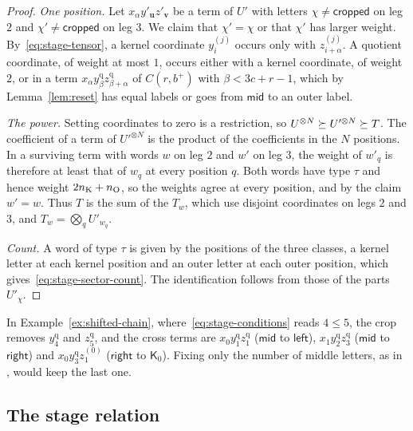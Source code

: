 \begin{proof}
\emph{One position.} Let \(x_\alpha y'_{\mathbf u}z'_{\mathbf v}\) be a
term of \(U'\) with letters \(\chi\ne\mathsf{cropped}\) on leg \(2\) and
\(\chi'\ne\mathsf{cropped}\) on leg \(3\). We claim that \(\chi'=\chi\) or
that \(\chi'\) has larger weight. By~\eqref{eq:stage-tensor}, a kernel
coordinate \(y^{(j)}_i\) occurs only with \(z^{(j)}_{i+\alpha}\). A
quotient coordinate, of weight at most \(1\), occurs either with a kernel
coordinate, of weight \(2\), or in a term
\(x_\alpha y^{\mathrm q}_\beta z^{\mathrm q}_{\beta+\alpha}\) of
\(C(r,b^+)\) with \(\beta<3c+r-1\), which by Lemma~\ref{lem:reset} has
equal labels or goes from \(\mathsf{mid}\) to an outer label.

\emph{The power.} Setting coordinates to zero is a restriction, so
\(U^{\otimes N}\succeq U'^{\otimes N}\succeq T\). The coefficient of a term
of \(U'^{\otimes N}\) is the product of the coefficients in the \(N\)
positions. In a surviving term with words \(w\) on leg \(2\) and \(w'\)
on leg \(3\), the weight of \(w'_q\) is therefore at least that of
\(w_q\) at every position \(q\). Both words have type \(\tau\)
and hence weight \(2n_{\mathrm K}+n_{\mathrm O}\), so the weights agree at every position,
and by the claim \(w'=w\). Thus \(T\) is the sum of the \(T_w\), which use
disjoint coordinates on legs \(2\) and \(3\), and
\(T_w=\bigotimes_qU'_{w_q}\).

\emph{Count.} A word of type \(\tau\) is given by the positions of the
three classes, a kernel letter at each kernel position and an outer
letter at each outer position, which gives~\eqref{eq:stage-sector-count}.
The identification follows from those of the parts \(U'_\chi\).
\end{proof}

In Example~\ref{ex:shifted-chain}, where~\eqref{eq:stage-conditions}
reads \(4\le5\), the crop removes \(y^{\mathrm q}_4\) and
\(z^{\mathrm q}_5\), and the cross terms are
\(x_0y^{\mathrm q}_1z^{\mathrm q}_1\) (\(\mathsf{mid}\) to
\(\mathsf{left}\)), \(x_1y^{\mathrm q}_2z^{\mathrm q}_3\) (\(\mathsf{mid}\)
to \(\mathsf{right}\)) and \(x_0y^{\mathrm q}_3z^{(0)}_1\)
(\(\mathsf{right}\) to \(\mathsf K_0\)). Fixing only the number of middle
letters, as in \citep[Lemma~4.5]{FinCon26}, would keep the last one.

\subsection{The stage relation}
\label{subsec:stage-relation}


